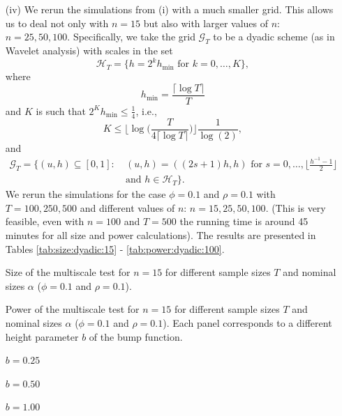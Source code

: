 \documentclass[a4paper,12pt]{article}
\begin{document}
\begin{enumerate}[label=\arabic*.,leftmargin=0.6cm]
{\begin{itemize}[topsep=0pt]
\item[(iv)] We rerun the simulations from (i) with a much smaller grid. This allows us to deal not only with $n=15$ but also with larger values of $n$: $n=25, 50, 100$. Specifically, we take the grid $\mathcal{G}_T$ to be a dyadic scheme (as in Wavelet analysis) with scales in the set 
\[ \mathcal{H}_T = \big\{ h = 2^k h_{\min} \text{ for } k=0,\ldots,K \big\}, \]  
where 
\[ h_{\min} = \frac{\lceil \log T \rceil}{T} \]
and $K$ is such that $2^K h_{\min} \le \frac{1}{4}$, i.e.,
\[ K \le \Big\lfloor \log\Big(\frac{T}{4 \lceil \log T \rceil }\Big) \Big\rfloor \frac{1}{\log(2)}, \]
and 
\begin{align*}
\mathcal{G}_T = \big\{ (u,h) \subseteq [0,1]: & \ (u,h) = ((2s+1) h, h) \text{ for } s = 0,\ldots,\Big\lfloor \frac{h^ {-1}-1}{2} \Big\rfloor \\ & \ \text{and } h \in \mathcal{H}_T \big\}.
\end{align*}
{\color{red} We rerun the simulations for the case $\phi = 0.1$ and $\rho = 0.1$ with $T=100, 250, 500$ and different values of $n$: $n=15, 25, 50, 100$. (This is very feasible, even with $n = 100$ and $T = 500$ the running time is around 45 minutes for all size and power calculations). The results are presented in Tables \ref{tab:size:dyadic:15} - \ref{tab:power:dyadic:100}.}

\addtocounter{table}{-1} 
\begin{table}[t]
\footnotesize{
\begin{center}
\caption{Size of the multiscale test for $n = 15$ for different sample sizes $T$ and nominal sizes $\alpha$ ($\phi = 0.1$ and $\rho = 0.1$).}
\label{tab:size:dyadic:15}
\renewcommand{\arraystretch}{1.2}

\end{center}}
\footnotesize{
\begin{center}
\caption{Power of the multiscale test for $n = 15$ for different sample sizes $T$ and nominal sizes $\alpha$  ($\phi = 0.1$ and $\rho = 0.1$). Each panel corresponds to a different height parameter $b$ of the bump function.}\label{tab:power:dyadic:15}
\begin{subtable}[b]{0.32\textwidth}
\centering
\caption{$b = 0.25$}%
\renewcommand{\arraystretch}{1.2}

\end{subtable}
\begin{subtable}[b]{0.32\textwidth}
\centering
\caption{$b = 0.50$}%
\renewcommand{\arraystretch}{1.2}

\end{subtable}
\begin{subtable}[b]{0.32\textwidth}
\centering
\caption{$b = 1.00$}%
\renewcommand{\arraystretch}{1.2}

\end{subtable}
\end{center}}
\vspace{-0.4cm}
\end{table}


\end{itemize}}
\end{enumerate}
\end{document}
